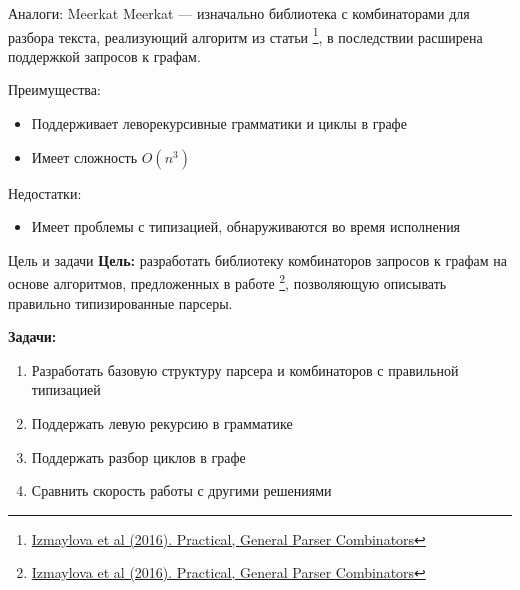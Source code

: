 \documentclass[aspectratio=169]{beamer}
\begin{document}
\begin{frame}{Аналоги: Meerkat}
  Meerkat --- изначально библиотека с комбинаторами для разбора текста, реализующий алгоритм из статьи \footnote[1]{\href{https://dl.acm.org/doi/10.1145/2847538.2847539}
    {Izmaylova et al (2016). Practical, General Parser Combinators}}, в последствии расширена поддержкой запросов к графам.

    Преимущества:
          \begin{itemize}
            \item Поддерживает леворекурсивные грамматики и циклы в графе
            \item Имеет сложность $O(n^3)$
          \end{itemize}
    Недостатки:
          \begin{itemize}
            \item Имеет проблемы с типизацией, обнаруживаются во время исполнения
          \end{itemize}
\end{frame}


\begin{frame}{Цель и задачи}
  \textbf{Цель:} разработать библиотеку комбинаторов запросов к графам на основе алгоритмов, предложенных в работе \footnote[1]{\href{https://dl.acm.org/doi/10.1145/2847538.2847539}
    {Izmaylova et al (2016). Practical, General Parser Combinators}}, позволяющую описывать правильно типизированные парсеры.

  \textbf{Задачи:}
  \begin{enumerate}
    \item Разработать базовую структуру парсера и комбинаторов с правильной типизацией
    \item Поддержать левую рекурсию в грамматике
    \item Поддержать разбор циклов в графе
    \item Сравнить скорость работы с другими решениями
  \end{enumerate}
\end{frame}
\end{document}
